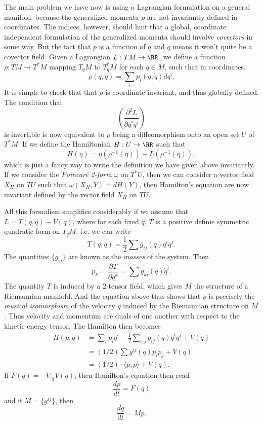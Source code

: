 \begin{example}
    The main problem we have now is using a Lagrangian formulation on a general manifold, because the generalized momenta $p$ are not invariantly defined in coordinates. The indices, however, should hint that a global, coordinate independent formulation of the generalized momenta should involve \emph{covectors} in some way. But the fact that $p$ is a function of $q$ and $\dot{q}$ means it won't quite be a covector field. Given a Lagrangian $L: TM \to \RR$, we define a function $\rho: TM \to T^*M$ mapping $T_q M$ to $T^*_q M$ for each $q \in M$, such that in coordinates,
    \[ \rho(q,\dot{q}) = \sum_i p_i(q,\dot{q}) dq^i. \]
    It is simple to check that that $\rho$ is coordinate invariant, and thus globally defined. The condition that
    \[ \left( \frac{\partial^2 L}{\partial \dot{q}^i \dot{q}^j} \right) \]
    is invertible is now equivalent to $\rho$ being a diffeomorphism onto an open set $U$ of $T^*M$. If we define the Hamiltonian $H: U \to \RR$ such that
    \[ H(\eta) = \eta(\rho^{-1}(\eta)) - L(\rho^{-1}(\eta)), \]
    which is just a fancy way to write the definition we have given above invariantly. If we consider the \emph{Poincar\'{e} 2-form} $\omega$ on $T^*U$, then we can consider a vector field $X_H$ on $TU$ such that $\omega(X_H,Y) = dH(Y)$, then Hamilton's equation are now invariant defined by the vector field $X_H$ on $TU$.

    All this formalism simplifies considerably if we assume that $L = T(q,\dot{q}) - V(q)$, where for each fixed $q$, $T$ is a positive definie symmetric quadratic form on $T_q M$, i.e. we can write
    \[ T(q,\dot{q}) = \frac{1}{2} \sum g_{ij}(q) \dot{q}^i \dot{q}^j. \]
    The quantities $\{ g_{ij} \}$ are known as the \emph{masses} of the system. Then
    \[ p_k = \frac{\partial T}{\partial \dot{q}^k} = \sum g_{ki}(q) \dot{q}^i. \]
    The quantity $T$ is induced by a 2-tensor field, which gives $M$ the structure of a Riemannian manifold. And the equation above thus shows that $p$ is precisely the \emph{musical isomorphism} of the velocity $\dot{q}$ induced by the Riemannian structure on $M$. Thus velocity and momentum are duals of one another with respect to the kinetic energy tensor. The Hamilton then becomes
    \begin{align*}
        H(p,q) &= \sum_i p_i \dot{q}^i - \frac{1}{2} \sum_{i,j} g_{ij}(q) \dot{q}^i \dot{q}^j + V(q)\\
        &= (1/2) \sum g^{ij}(q) p_i p_j + V(q)\\
        &= (1/2) \cdot \langle p, p \rangle + V(q).
    \end{align*}
    If $F(q) = - \nabla_q V(q)$, then Hamilton's equation then read
    \[ \frac{dp}{dt} = F(q) \]
    and if $M = \{ g^{ij} \}$, then
    \[ \frac{dq}{dt} = M p. \]


\end{example}
